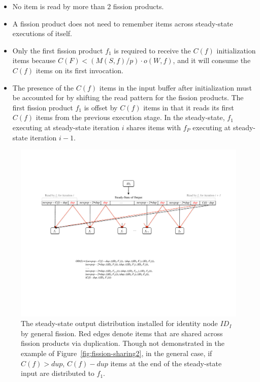 \begin{itemize}
\item No item is read by more than 2 fission products.
\item  A fission product does not need to remember items across
  steady-state executions of itself.
\item Only the first fission product $f_1$ is required to receive the $C(f)$
  initialization  items because $C(F) < (M(S,f) / p) \cdot o(W, f)$,
  and it will consume the $C(f)$ items on its first invocation.
\item The presence of the $C(f)$ items in the input buffer after
  initialization must be accounted for by shifting the read pattern
  for the fission products.  The first fission product $f_1$ is offset by
  $C(f)$ items in that it reads its first $C(f)$ items from the
  previous execution stage.  In the steady-state, $f_1$ executing at
  steady-state iteration $i$ shares items with $f_P$ executing at
  steady-state iteration $i-1$.
\end{itemize}


\begin{figure}
\centering
\includegraphics[width=\textwidth]{figures/split-pattern.pdf}
\caption[The output distribution required for general
fission.]{
The steady-state output distribution installed for identity node
$ID_I$ by general fission.  Red edges denote items that are shared
across fission products via duplication.  Though not demonstrated in
the example of Figure~\ref{fig:fission-sharing2}, in the general
case, if $C(f) > dup$, $C(f) - dup$ items at the end of the
steady-state input are distributed to $f_1$. \label{fig:split-pattern}}
\end{figure}

